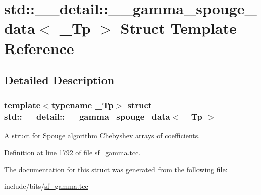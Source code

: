 \hypertarget{structstd_1_1____detail_1_1____gamma__spouge__data}{}\section{std\+:\+:\+\_\+\+\_\+detail\+:\+:\+\_\+\+\_\+gamma\+\_\+spouge\+\_\+data$<$ \+\_\+\+Tp $>$ Struct Template Reference}
\label{structstd_1_1____detail_1_1____gamma__spouge__data}


\subsection{Detailed Description}
\subsubsection*{template$<$typename \+\_\+\+Tp$>$\newline
struct std\+::\+\_\+\+\_\+detail\+::\+\_\+\+\_\+gamma\+\_\+spouge\+\_\+data$<$ \+\_\+\+Tp $>$}

A struct for Spouge algorithm Chebyshev arrays of coefficients. 

Definition at line 1792 of file sf\+\_\+gamma.\+tcc.



The documentation for this struct was generated from the following file\+:\begin{DoxyCompactItemize}
\item 
include/bits/\hyperlink{sf__gamma_8tcc}{sf\+\_\+gamma.\+tcc}\end{DoxyCompactItemize}
